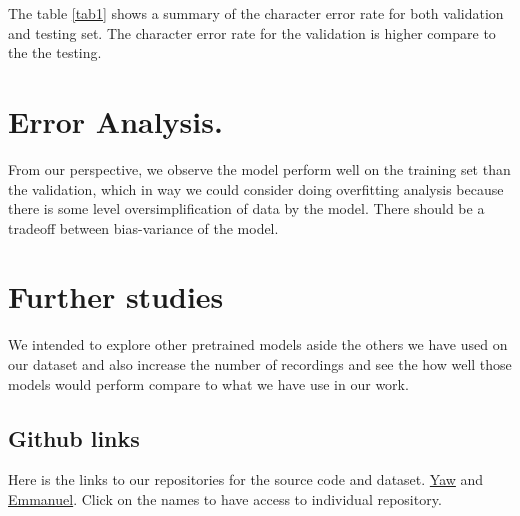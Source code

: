 \documentclass[10pt,a4paper]{article}
\begin{document}
The table \ref{tab1} shows a summary of the character error rate for both validation and testing set. The character error rate for the validation is higher compare to the the testing. 

\section{Error Analysis.}

From our perspective, we observe the model perform well on the training set than the validation, which in way we could consider doing overfitting analysis because there is some level oversimplification of data by the model. There should be a tradeoff between bias-variance of the model. 


\section{Further studies}

We intended to explore other pretrained models aside the others we have used on our dataset and also increase the number of recordings and see the how well those models would perform compare to what we have use in our work. 

\subsection{Github links}

Here is the links to our repositories for the source code and dataset. 
\href{https://github.com/YawBrefo/AMMI-2020-Speech-Recognition-Twi-Audio-dataset}{Yaw}  and 
 \href{https://github.com/Agbeli/Speech_recognition_AMMI}{Emmanuel}. Click on the names to have access to individual repository. 
\end{document}
